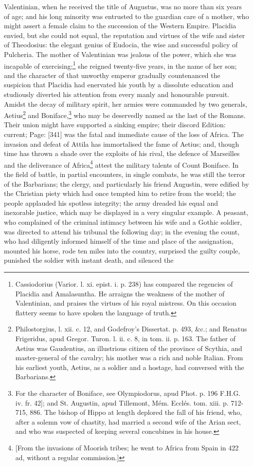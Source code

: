 Valentinian, when he received the title of Augustus, was no more than six years of age; and his long minority was entrusted to the guardian care of a mother, who might assert a female claim to the succession of the Western Empire. Placidia envied, but she could not equal, the reputation and virtues of the wife and sister of Theodosius: the elegant genius of Eudocia, the wise and successful policy of Pulcheria. The mother of Valentinian was jealous of the power, which she was incapable of exercising;\footnote{Cassiodorius (Varior. l. xi. epist. i. p. 238) has compared the regencies of Placidia and Amalasuntha. He arraigns the weakness of the mother of Valentinian, and praises the virtues of his royal mistress. On this occasion flattery seems to have spoken the language of truth.} she reigned twenty-five years, in the name of her son; and the character of that unworthy emperor gradually countenanced the suspicion that Placidia had enervated his youth by a dissolute education and studiously diverted his attention from every manly and honourable pursuit. Amidst the decay of military spirit, her armies were commanded by two generals, Aetius\footnote{Philostorgius, l. xii. c. 12, and Godefroy\texthebrew{}’s Dissertat. p. 493, \&c.; and Renatus Frigeridus, apud Gregor. Turon. l. ii. c. 8, in tom. ii. p. 163. The father of Aetius was Gaudentius, an illustrious citizen of the province of Scythia, and master-general of the cavalry; his mother was a rich and noble Italian. From his earliest youth, Aetius, as a soldier and a hostage, had conversed with the Barbarians.} and Boniface,\footnote{For the character of Boniface, see Olympiodorus, apud Phot. p. 196 F.H.G. iv. fr. 42]; and St. Augustin, apud Tillemont, Mém. Ecclés. tom. xiii. p. 712-715, 886. The bishop of Hippo at length deplored the fall of his friend, who, after a solemn vow of chastity, had married a second wife of the Arian sect, and who was suspected of keeping several concubines in his house.} who may be deservedly named as the last of the Romans. Their union might have supported a sinking empire; their discord Edition: current; Page: [341] was the fatal and immediate cause of the loss of Africa. The invasion and defeat of Attila has immortalised the fame of Aetius; and, though time has thrown a shade over the exploits of his rival, the defence of Marseilles and the deliverance of Africa\footnote{[From the invasions of Moorish tribes; he went to Africa from Spain in 422 ad, without a regular commission.]} attest the military talents of Count Boniface. In the field of battle, in partial encounters, in single combats, he was still the terror of the Barbarians; the clergy, and particularly his friend Augustin, were edified by the Christian piety which had once tempted him to retire from the world; the people applauded his spotless integrity; the army dreaded his equal and inexorable justice, which may be displayed in a very singular example. A peasant, who complained of the criminal intimacy between his wife and a Gothic soldier, was directed to attend his tribunal the following day; in the evening the count, who had diligently informed himself of the time and place of the assignation, mounted his horse, rode ten miles into the country, surprised the guilty couple, punished the soldier with instant death, and silenced the 